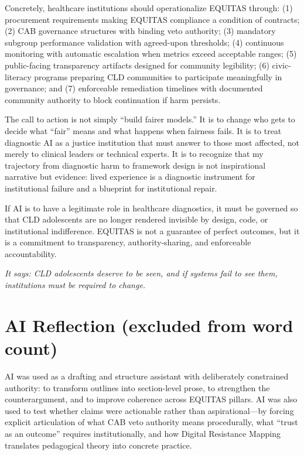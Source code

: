 \documentclass[12pt,a4paper]{article}
\begin{document}
Concretely, healthcare institutions should operationalize EQUITAS through: (1) procurement requirements making EQUITAS compliance a condition of contracts; (2) CAB governance structures with binding veto authority; (3) mandatory subgroup performance validation with agreed-upon thresholds; (4) continuous monitoring with automatic escalation when metrics exceed acceptable ranges; (5) public-facing transparency artifacts designed for community legibility; (6) civic-literacy programs preparing CLD communities to participate meaningfully in governance; and (7) enforceable remediation timelines with documented community authority to block continuation if harm persists.\cite{garcia_ed415}

The call to action is not simply ``build fairer models.'' It is to change who gets to decide what ``fair'' means and what happens when fairness fails. It is to treat diagnostic AI as a justice institution that must answer to those most affected, not merely to clinical leaders or technical experts. It is to recognize that my trajectory from diagnostic harm to framework design is not inspirational narrative but evidence: lived experience is a diagnostic instrument for institutional failure and a blueprint for institutional repair.\cite{garcia_ed415}

If AI is to have a legitimate role in healthcare diagnostics, it must be governed so that CLD adolescents are no longer rendered invisible by design, code, or institutional indifference. EQUITAS is not a guarantee of perfect outcomes, but it is a commitment to transparency, authority-sharing, and enforceable accountability. 

\textit{It says: CLD adolescents deserve to be seen, and if systems fail to see them, institutions must be required to change.}\cite{garcia_ed415}

\section*{AI Reflection (excluded from word count)}

AI was used as a drafting and structure assistant with deliberately constrained authority: to transform outlines into section-level prose, to strengthen the counterargument, and to improve coherence across EQUITAS pillars. AI was also used to test whether claims were actionable rather than aspirational—by forcing explicit articulation of what CAB veto authority means procedurally, what ``trust as an outcome'' requires institutionally, and how Digital Resistance Mapping translates pedagogical theory into concrete practice.\cite{garcia_ed415}
\end{document}
